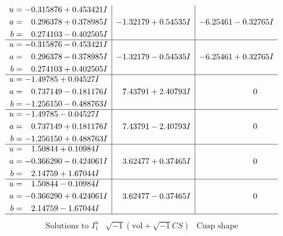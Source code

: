 \documentclass[1p]{elsarticle_modified}
\theoremstyle{definition}
\newcommand{\I}{\sqrt{-1}}
\begin{document}
$$\begin{array}{c|c|c}
\begin{aligned}
u &= -0.315876 + 0.453421 I \\
a &= \phantom{-}0.296378 + 0.378985 I \\
b &= \phantom{-}0.274103 - 0.402505 I\end{aligned}
 & -1.32179 + 0.54535 I & -6.25461 - 0.32765 I \\ \hline\begin{aligned}
u &= -0.315876 - 0.453421 I \\
a &= \phantom{-}0.296378 - 0.378985 I \\
b &= \phantom{-}0.274103 + 0.402505 I\end{aligned}
 & -1.32179 - 0.54535 I & -6.25461 + 0.32765 I \\ \hline\begin{aligned}
u &= -1.49785 + 0.04527 I \\
a &= \phantom{-}0.737149 - 0.181176 I \\
b &= -1.256150 - 0.488763 I\end{aligned}
 & \phantom{-}7.43791 + 2.40793 I & \phantom{-0.000000 } 0 \\ \hline\begin{aligned}
u &= -1.49785 - 0.04527 I \\
a &= \phantom{-}0.737149 + 0.181176 I \\
b &= -1.256150 + 0.488763 I\end{aligned}
 & \phantom{-}7.43791 - 2.40793 I & \phantom{-0.000000 } 0 \\ \hline\begin{aligned}
u &= \phantom{-}1.50844 + 0.10984 I \\
a &= -0.366290 - 0.424061 I \\
b &= \phantom{-}2.14759 + 1.67044 I\end{aligned}
 & \phantom{-}3.62477 + 0.37465 I & \phantom{-0.000000 } 0 \\ \hline\begin{aligned}
u &= \phantom{-}1.50844 - 0.10984 I \\
a &= -0.366290 + 0.424061 I \\
b &= \phantom{-}2.14759 - 1.67044 I\end{aligned}
 & \phantom{-}3.62477 - 0.37465 I & \phantom{-0.000000 } 0\\
 \hline 
 \end{array}$$\newpage$$\begin{array}{c|c|c}  
\text{Solutions to }I^u_{1}& \I (\text{vol} + \sqrt{-1}CS) & \text{Cusp shape}\\
 \hline 
\begin{aligned}

\end{aligned}
\end{array}$$
\end{document}
